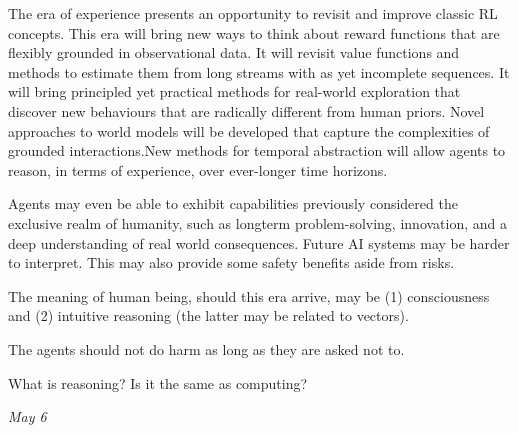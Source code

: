The era of experience presents an opportunity to revisit and improve classic RL concepts. This era will bring new ways to think about reward functions that are flexibly grounded in observational data. It will revisit value functions and methods to estimate them from long streams with as yet incomplete sequences. It will bring principled yet practical methods for real-world exploration that discover new behaviours that are radically different from human priors. Novel approaches to world models will be developed that capture the complexities of grounded interactions.New methods for temporal abstraction will allow agents to reason, in terms of experience, over ever-longer time horizons.


Agents may even be able to exhibit capabilities previously considered the exclusive realm of humanity, such as longterm problem-solving, innovation, and a deep understanding of real world consequences. Future AI systems may be harder to interpret. This may also provide some safety benefits aside from risks.


The meaning of human being, should this era arrive, may be (1) consciousness and (2) intuitive reasoning (the latter may be related to vectors).


The agents should not do harm as long as they are asked not to.

What is reasoning? Is it the same as computing?

\bigskip
\textit{May 6}
